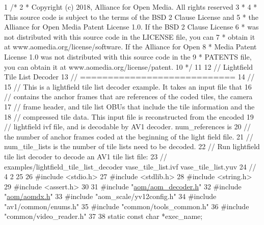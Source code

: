 \begin{DoxyCodeInclude}
1 \textcolor{comment}{/*}
2 \textcolor{comment}{ * Copyright (c) 2018, Alliance for Open Media. All rights reserved}
3 \textcolor{comment}{ *}
4 \textcolor{comment}{ * This source code is subject to the terms of the BSD 2 Clause License and}
5 \textcolor{comment}{ * the Alliance for Open Media Patent License 1.0. If the BSD 2 Clause License}
6 \textcolor{comment}{ * was not distributed with this source code in the LICENSE file, you can}
7 \textcolor{comment}{ * obtain it at www.aomedia.org/license/software. If the Alliance for Open}
8 \textcolor{comment}{ * Media Patent License 1.0 was not distributed with this source code in the}
9 \textcolor{comment}{ * PATENTS file, you can obtain it at www.aomedia.org/license/patent.}
10 \textcolor{comment}{ */}
11 
12 \textcolor{comment}{// Lightfield Tile List Decoder}
13 \textcolor{comment}{// ============================}
14 \textcolor{comment}{//}
15 \textcolor{comment}{// This is a lightfield tile list decoder example. It takes an input file that}
16 \textcolor{comment}{// contains the anchor frames that are references of the coded tiles, the camera}
17 \textcolor{comment}{// frame header, and tile list OBUs that include the tile information and the}
18 \textcolor{comment}{// compressed tile data. This input file is reconstructed from the encoded}
19 \textcolor{comment}{// lightfield ivf file, and is decodable by AV1 decoder. num\_references is}
20 \textcolor{comment}{// the number of anchor frames coded at the beginning of the light field file.}
21 \textcolor{comment}{// num\_tile\_lists is the number of tile lists need to be decoded.}
22 \textcolor{comment}{// Run lightfield tile list decoder to decode an AV1 tile list file:}
23 \textcolor{comment}{// examples/lightfield\_tile\_list\_decoder vase\_tile\_list.ivf vase\_tile\_list.yuv}
24 \textcolor{comment}{// 4 2}
25 
26 \textcolor{preprocessor}{#include <stdio.h>}
27 \textcolor{preprocessor}{#include <stdlib.h>}
28 \textcolor{preprocessor}{#include <string.h>}
29 \textcolor{preprocessor}{#include <assert.h>}
30 
31 \textcolor{preprocessor}{#include "\hyperlink{aom__decoder_8h}{aom/aom\_decoder.h}"}
32 \textcolor{preprocessor}{#include "\hyperlink{aomdx_8h}{aom/aomdx.h}"}
33 \textcolor{preprocessor}{#include "aom\_scale/yv12config.h"}
34 \textcolor{preprocessor}{#include "av1/common/enums.h"}
35 \textcolor{preprocessor}{#include "common/tools\_common.h"}
36 \textcolor{preprocessor}{#include "common/video\_reader.h"}
37 
38 \textcolor{keyword}{static} \textcolor{keyword}{const} \textcolor{keywordtype}{char} *exec\_name;

\end{DoxyCodeInclude}
